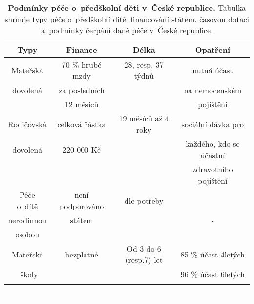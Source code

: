 \begin{spacing}{1.0}
\begin{table}[h!]
	\center
	\small
	\begin{center}
	\begin{tabular}{|c|c|c|c|}
		\hline
		\rowcolor{grey}
		\textbf{Typy}	 & \textbf{Finance}		& \textbf{Délka}		& \textbf{Opatření}	 \\
		\hline
		\hline
		Mateřská & 70 \% hrubé mzdy 		& 28, resp. 37 týdnů	& nutná účast  			\\ \rowcolor{grey!10}
		dovolená & za posledních	 		& 						& na nemocenském 		\\ \rowcolor{grey!10}
				 & 12 měsíců				& 						& pojištění				\\ \rowcolor{grey!10}
		\hline
		Rodičovská 	& celková částka  		& 19 měsíců až 4 roky	& sociální dávka pro 	\\ \rowcolor{grey!10}
		dovolená 	& 220 000 Kč			& 					& každého, kdo se účastní	\\ \rowcolor{grey!10}
					&						&						& zdravotního pojištění \\ \rowcolor{grey!10}
		\hline
		Péče o~dítě & není podporováno		& dle potřeby			&   					\\ \rowcolor{grey!10}
		nerodinnou	& státem				&						&	-					\\ \rowcolor{grey!10}
		osobou 		&						&						&						\\ \rowcolor{grey!10}
		\hline
		Mateřské	& 	bezplatné 			& Od 3 do 6 (resp.7) let & 85 \% účast 4letých 	\\ \rowcolor{grey!10}\
		školy 		& 						&  						 & 96 \% účast 6letých 	\\ \rowcolor{grey!10}
		\hline
	\end{tabular}
	\end{center}
	\label{tab:peceCR}
	\caption{
		\textbf{Podmínky péče o~předškolní děti v~České republice.}
				Tabulka shrnuje typy péče o~předškolní dítě, financování státem, časovou dotaci a~podmínky čerpání dané péče v~České republice.
	}
\end{table}
\end{spacing}	
\vspace{10cm}
\textcolor{white}{.}



